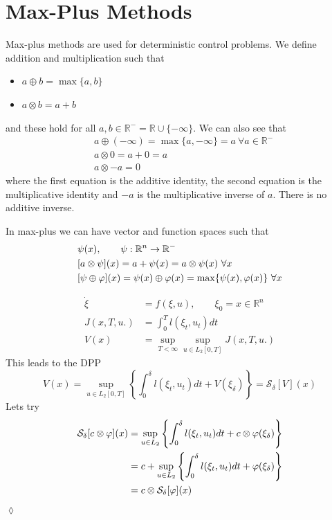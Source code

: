 \section{Max-Plus Methods}
Max-plus methods are used for deterministic control problems.
We define addition and multiplication such that
\begin{itemize}
\item $a\oplus b=\max\{a,b\}$
\item $a\otimes b = a+b$
\end{itemize}
and these hold for all $a,b\in\mathbb{R}^- = \mathbb{R}\cup\{-\infty\}$.
We can also see that
\begin{align*}
&a\oplus(-\infty) = \max\{a,-\infty\} = a~\forall a\in\mathbb{R}^- \\
&a\otimes0 = a+0=a \\
&a\otimes-a = 0
\end{align*}
where the first equation is the additive identity, the second equation is the multiplicative identity and $-a$ is the multiplicative inverse of $a$.
There is no additive inverse.

In max-plus we can have vector and function spaces such that
\begin{align*}
&\psi(x), \qquad \psi:\mathbb{R}^n\to\mathbb{R}^- \\
&[a\otimes \psi](x) = a+\psi(x) = a\otimes\psi(x)~\forall x \\
&[\psi\oplus\varphi](x) = \psi(x)\oplus\varphi(x) = \max\{\psi(x),\varphi(x)\}~\forall x
\end{align*}

\begin{example}
\begin{align*}
\dot{\xi} &= f(\xi,u), \qquad \xi_0=x\in\mathbb{R}^n \\
J(x,T,u.) &= \int_0^T l(\xi_t,u_t)dt \\
V(x) &= \sup_{T<\infty}\sup_{u\in L_2[0,T]}J(x,T,u.)
\end{align*}
This leads to the DPP
$$V(x) = \sup_{u\in L_2[0,T]}\left\lbrace \int_0^\delta l(\xi_t,u_t)dt + V(\xi_\delta) \right\rbrace = \mathcal{S}_\delta[V](x)$$
Lets try
\begin{align*}
\mathcal{S}_\delta[c\otimes\varphi](x) &= \sup_{u\in L_2}\left\lbrace \int_0^\delta l(\xi_t,u_t)dt + c\otimes\varphi(\xi_\delta) \right\rbrace \\
&= c + \sup_{u\in L_2}\left\lbrace \int_0^\delta l(\xi_t,u_t)dt + \varphi(\xi_\delta)\right\rbrace \\
&= c\otimes\mathcal{S}_\delta[\varphi](x)
\end{align*}
$\lozenge$
\end{example}

